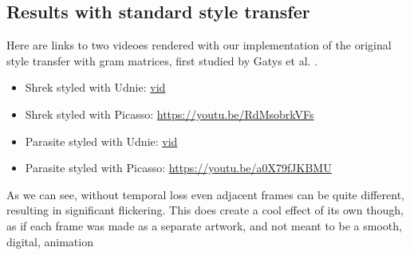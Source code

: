 \subsection{Results with standard style transfer}
Here are links to two videoes rendered with our implementation of the original style transfer with gram matrices, first studied by Gatys et al. \cite{Gatys:1}. 
\begin{itemize}
\item{Shrek styled with Udnie: \url{vid}}
\item{Shrek styled with Picasso: \url{https://youtu.be/RdMsobrkVFs}}
\item{Parasite styled with Udnie: \url{vid}}
\item{Parasite styled with Picasso: \url{https://youtu.be/a0X79fJKBMU}}
\end{itemize}
As we can see, without temporal loss even adjacent frames can be quite different, resulting in significant flickering. This does create a cool effect of its own though, as if each frame was made as a separate artwork, and not meant to be a smooth, digital, animation